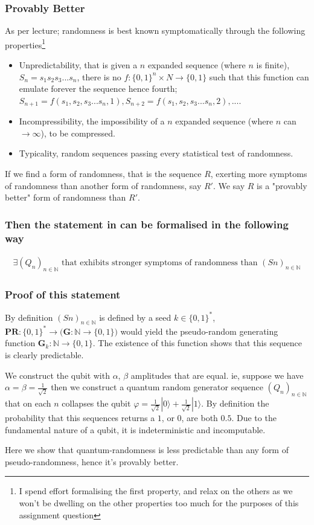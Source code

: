 \documentclass{article}
\begin{document}
\subsubsection*{Provably Better}
As per lecture; randomness is best known symptomatically through the following properties\footnote{I spend effort formalising the first property, and relax on the others as we won't be dwelling on the other properties too much for the purposes of this assignment question}

\begin{itemize}
	\item Unpredictability, that is given a $n$ expanded sequence (where $n$ is finite), $S_n=s_1s_2s_3...s_n$, there is no $f: \{0,1\}^n \times N \rightarrow \{0,1\}$ such that this function can emulate forever the sequence hence fourth; $S_{n+1} = f(s_1,s_2,s_3...s_n, 1), S_{n+2} = f(s_1,s_2,s_3...s_n, 2), ...$.
	\item Incompressibility, the impossibility of a $n$ expanded sequence (where $n$ can $\rightarrow \infty$), to be compressed.
	\item Typicality, random sequences passing every statistical test of randomness.
\end{itemize}

If we find a form of randomness, that is the sequence $R$, exerting more symptoms of randomness than another form of randomness, say $R'$. We say $R$ is a "provably better" form of randomness than $R'$.

\subsubsection{Then the statement in can be formalised in the following way}
\begin{align*}
	\exists (Q_n)_{n \in \mathbb{N}} \text{ that exhibits stronger symptoms of randomness than } (Sn)_{n\in\mathbb{N}}
\end{align*}

\subsubsection{Proof of this statement}
By definition $(Sn)_{n\in\mathbb{N}}$ is defined by a seed $k \in \{0,1\}^*$, $\bm{PR}: \{0,1\}^* \rightarrow \bigl(\bm{G}: \mathbb{N} \rightarrow \{0,1\}\bigr)$ would yield the pseudo-random generating function $\bm{G}_k: \mathbb{N} \rightarrow \{0,1\}$. The existence of this function shows that this sequence is clearly predictable.

We construct the qubit with $\alpha$, $\beta$ amplitudes that are equal. ie, suppose we have $\alpha = \beta = \frac{1}{\sqrt{2}}$ then we construct a quantum random generator sequence $(Q_n)_{n \in \mathbb{N}}$ that on each $n$ collapses the qubit $\varphi = \frac{1}{\sqrt{2}} | 0\rangle + \frac{1}{\sqrt{2}} | 1\rangle$. By definition the probability that this sequences returns a $1$, or $0$, are both $0.5$. Due to the fundamental nature of a qubit, it is indeterministic and incomputable.

Here we show that quantum-randomness is less predictable than any form of pseudo-randomness, hence it's provably better.
\end{document}
